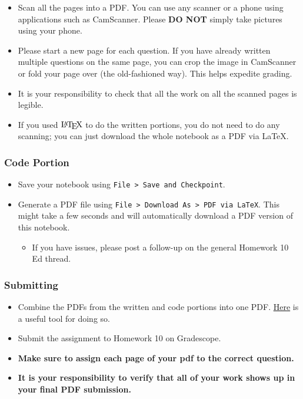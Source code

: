 \documentclass[11pt]{article}
\providecommand{\tightlist}{%
      \setlength{\itemsep}{0pt}\setlength{\parskip}{0pt}}
\let\Oldlatex\LaTeX
\renewcommand{\LaTeX}{\textrm{\Oldlatex}}
\begin{document}
\begin{itemize}
\tightlist
\item
  Scan all the pages into a PDF. You can use any scanner or a phone
  using applications such as CamScanner. Please \textbf{DO NOT} simply
  take pictures using your phone.
\item
  Please start a new page for each question. If you have already written
  multiple questions on the same page, you can crop the image in
  CamScanner or fold your page over (the old-fashioned way). This helps
  expedite grading.
\item
  It is your responsibility to check that all the work on all the
  scanned pages is legible.
\item
  If you used \(\LaTeX\) to do the written portions, you do not need to
  do any scanning; you can just download the whole notebook as a PDF via
  LaTeX.
\end{itemize}

\hypertarget{code-portion}{%
\subsubsection{Code Portion}\label{code-portion}}

\begin{itemize}
\tightlist
\item
  Save your notebook using
  \texttt{File\ \textgreater{}\ Save\ and\ Checkpoint}.
\item
  Generate a PDF file using
  \texttt{File\ \textgreater{}\ Download\ As\ \textgreater{}\ PDF\ via\ LaTeX}.
  This might take a few seconds and will automatically download a PDF
  version of this notebook.

  \begin{itemize}
  \tightlist
  \item
    If you have issues, please post a follow-up on the general Homework
    10 Ed thread.
  \end{itemize}
\end{itemize}

\hypertarget{submitting}{%
\subsubsection{Submitting}\label{submitting}}

\begin{itemize}
\tightlist
\item
  Combine the PDFs from the written and code portions into one PDF.
  \href{https://smallpdf.com/merge-pdf}{Here} is a useful tool for doing
  so.
\item
  Submit the assignment to Homework 10 on Gradescope.
\item
  \textbf{Make sure to assign each page of your pdf to the correct
  question.}
\item
  \textbf{It is your responsibility to verify that all of your work
  shows up in your final PDF submission.}
\end{itemize}
\end{document}
